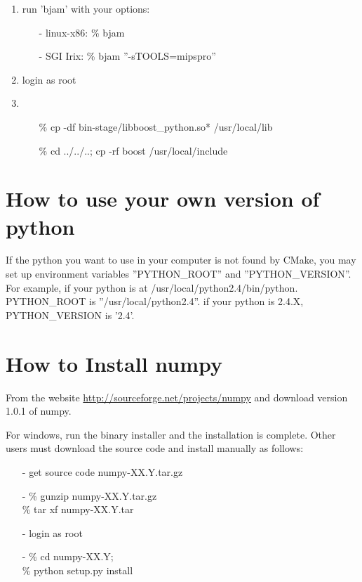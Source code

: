 \begin{enumerate}
     \item
       run 'bjam' with your options:
       \begin{itemize}
	 \item[-] linux-x86: {\% bjam}
	 \item[-] SGI Irix: {\% bjam ''-sTOOLS=mipspro''}
       \end{itemize}

     \item
       login as root
    
     \item

       \begin{itemize}
	 \item[\%] cp -df bin-stage/libboost\_python.so* /usr/local/lib
	 \item[\%] cd ../../..; cp -rf boost /usr/local/include
       \end{itemize}
       \normalcolor

  \end{enumerate}


\section{How to use your own version of python}

   If the python you want to use in your computer is not found by CMake,
    you may set up environment variables ''PYTHON\_ROOT'' and
    ''PYTHON\_VERSION''. For example, if your python is at
    /usr/local/python2.4/bin/python. PYTHON\_ROOT is
    ''/usr/local/python2.4''. if your python is 2.4.X, PYTHON\_VERSION
    is '2.4'.

\section{How to Install numpy}
   From the website
    \href{http://sourceforge.net/projects/numpy}{http://sourceforge.net/projects/numpy}
    and download 
    version 1.0.1 of numpy.
 
    For windows, run the binary installer and the installation is
    complete.  Other users must download the source code and install
    manually as follows:

    \begin{itemize}
      \item[-] get source code numpy-XX.Y.tar.gz

      \item[-] \% gunzip numpy-XX.Y.tar.gz \\
	\% tar xf numpy-XX.Y.tar
      \normalcolor
      \item[-] login as root

      \item[-] \% cd numpy-XX.Y; \\
	\% python setup.py install
      \normalcolor
    \end{itemize}



%